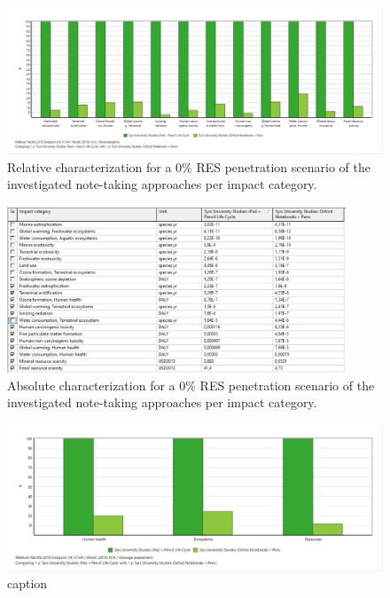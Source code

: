 \begin{figure}[H]
    \centering
    \includegraphics[width=\textwidth]{images/RES_0/Characterization_RES_0.JPG}
    \caption{Relative characterization for a 0\% RES penetration scenario of the investigated note-taking approaches per impact category.}\label{fig:characterization_RES_0}
\end{figure}

\begin{figure}[H]
    \centering
    \includegraphics[width=0.9\textwidth]{images/RES_0/Characterization_Table_RES_0.PNG}
    \caption{Absolute characterization for a 0\% RES penetration scenario of the investigated note-taking approaches per impact category.}\label{fig:characterization_table_RES_0}
\end{figure}

\begin{figure}[H]
    \centering
    \includegraphics[width=\textwidth]{images/RES_0/Damage_Assessment_RES_0.JPG}
    \caption{caption}\label{fig:damage_assessment_RES_0}
\end{figure}

